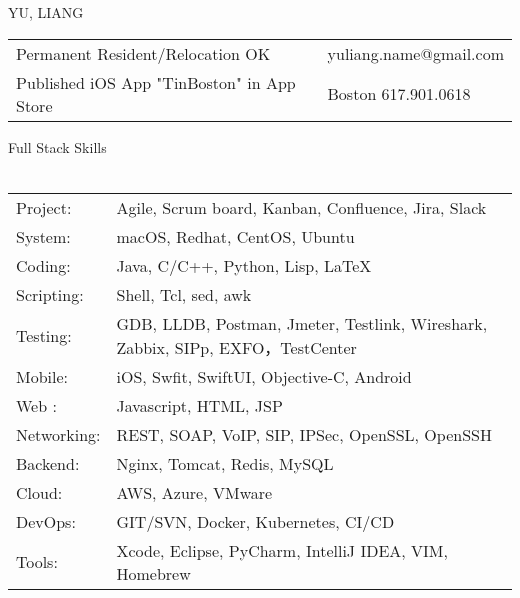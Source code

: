 \documentclass[10pt]{article}
\newcommand{\lineunder}{\vspace*{-8pt}\\\hspace*{-18pt}\hrulefill\\}
\newcommand{\header}[1]{{\hspace*{-15pt}\vspace*{6pt}\large{{#1}}}\vspace*{-6pt}\lineunder}
\begin{document}
\pagestyle{CVfooter}

\vspace*{-40pt}
\begin{center}
{\LARGE \scshape {YU, LIANG}}
\end{center}



\begin{center}

\begin{tabular}{l l}
\small{Permanent Resident/Relocation OK}    & \small{yuliang.name@gmail.com} \\
\small{Published iOS App "TinBoston" in App Store}         & \small{Boston 617.901.0618} \\
\end{tabular}

\end{center}



\header{Full Stack Skills}

\begin{tabular}{l l}

Project: & Agile, Scrum board, Kanban, Confluence, Jira, Slack \\
System: & macOS, Redhat, CentOS, Ubuntu \\
Coding: & Java, C/C++, Python, Lisp, \LaTeX \\
Scripting: & Shell, Tcl, sed, awk \\
Testing: & GDB, LLDB, Postman, Jmeter, Testlink, Wireshark, Zabbix, SIPp, EXFO，TestCenter \\
Mobile: & iOS, Swfit, SwiftUI, Objective-C, Android \\
Web : & Javascript, HTML, JSP \\
Networking: & REST, SOAP, VoIP, SIP, IPSec, OpenSSL, OpenSSH \\
Backend: & Nginx, Tomcat, Redis, MySQL \\
Cloud: & AWS, Azure, VMware \\
DevOps: & GIT/SVN, Docker, Kubernetes, CI/CD \\
Tools: & Xcode, Eclipse, PyCharm, IntelliJ IDEA, VIM, Homebrew \\

\end{tabular}
\vspace*{10pt}
\end{document}
